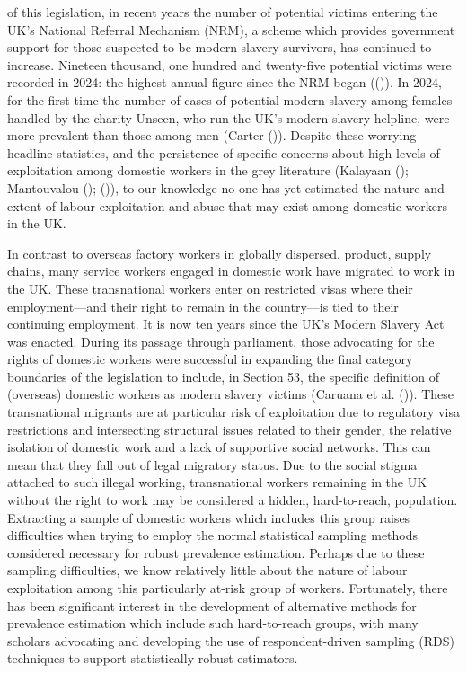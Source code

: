 \documentclass[
  12pt,
]{article}
\theoremstyle{plain}
\theoremstyle{definition}
\begin{document}
of this legislation, in recent years the number of potential victims
entering the UK's National Referral Mechanism (NRM), a scheme which
provides government support for those suspected to be modern slavery
survivors, has continued to increase. Nineteen thousand, one hundred and
twenty-five potential victims were recorded in 2024: the highest annual
figure since the NRM began
(()). In
2024, for the first time the number of cases of potential modern slavery
among females handled by the charity Unseen, who run the UK's modern
slavery helpline, were more prevalent than those among men (Carter
()). Despite these worrying
headline statistics, and the persistence of specific concerns about high
levels of exploitation among domestic workers in the grey literature
(Kalayaan (); Mantouvalou
();
()), to our knowledge
no-one has yet estimated the nature and extent of labour exploitation
and abuse that may exist among domestic workers in the UK.

In contrast to overseas factory workers in globally dispersed, product,
supply chains, many service workers engaged in domestic work have
migrated to work in the UK. These transnational workers enter on
restricted visas where their employment---and their right to remain in
the country---is tied to their continuing employment. It is now ten
years since the UK's Modern Slavery Act was enacted. During its passage
through parliament, those advocating for the rights of domestic workers
were successful in expanding the final category boundaries of the
legislation to include, in Section 53, the specific definition of
(overseas) domestic workers as modern slavery victims (Caruana et al.
()). These transnational
migrants are at particular risk of exploitation due to regulatory visa
restrictions and intersecting structural issues related to their gender,
the relative isolation of domestic work and a lack of supportive social
networks. This can mean that they fall out of legal migratory status.
Due to the social stigma attached to such illegal working, transnational
workers remaining in the UK without the right to work may be considered
a hidden, hard-to-reach, population. Extracting a sample of domestic
workers which includes this group raises difficulties when trying to
employ the normal statistical sampling methods considered necessary for
robust prevalence estimation. Perhaps due to these sampling
difficulties, we know relatively little about the nature of labour
exploitation among this particularly at-risk group of workers.
Fortunately, there has been significant interest in the development of
alternative methods for prevalence estimation which include such
hard-to-reach groups, with many scholars advocating and developing the
use of respondent-driven sampling (RDS) techniques to support
statistically robust estimators.
\end{document}
